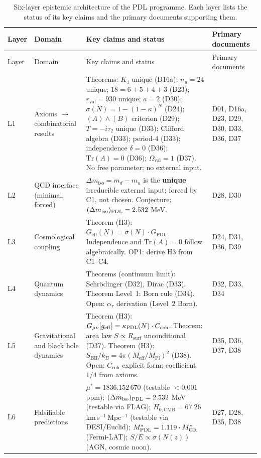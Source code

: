 \documentclass[11pt,a4paper]{article}
\theoremstyle{plain}
\theoremstyle{definition}
\theoremstyle{remark}
\newcommand{\PDL}{\textnormal{PDL}}
\newcommand{\Kfour}{K_4}
\newcommand{\Geff}{G_{\mathrm{eff}}}
\newcommand{\GPDL}{G_{\mathrm{PDL}}}
\newcommand{\rval}{r_{\mathrm{val}}}
\newcommand{\Rsurf}{R_{\mathrm{surf}}}
\newcommand{\sigmaN}{\sigma(N)}
\newcommand{\mustar}{\mu^*}
\newcommand{\SBH}{S_{\mathrm{BH}}}
\newcommand{\Meff}{M_{\mathrm{eff}}}
\newcommand{\MPl}{M_{\mathrm{Pl}}}
\begin{document}
\begin{longtable}{@{}L{0.6cm}L{3.0cm}L{5.5cm}L{4.0cm}@{}}
\caption{Six-layer epistemic architecture of the PDL programme. Each layer lists the status of its key claims and the primary documents supporting them.}
\label{tab:epistemic}\\
\toprule
Layer & Domain & Key claims and status & Primary documents \\
\midrule
\endfirsthead
\toprule
Layer & Domain & Key claims and status & Primary documents \\
\midrule
\endhead
\bottomrule
\endfoot

L1 & Axioms $\to$ combinatorial results &
\textcolor{proofblue}{Theorems}: $\Kfour$ unique (D16a); $n_u=24$ unique; $18=6+5+4+3$ (D23); $\rval=930$ unique; $a=2$ (D30); $\sigma(N)=1-(1-\kappa)^N$ (D24); $(A)\wedge(B)$ criterion (D29); $T=-i\tau_2$ unique (D33); Clifford algebra (D33); period-4 (D33); independence $\delta=0$ (D36); $\mathrm{Tr}(A)=0$ (D36); $\Omega_{\mathrm{val}}=1$ (D37).
No free parameter; no external input. &
D01, D16a, D23, D29, D30, D33, D36, D37 \\[0.4em]

L2 & QCD interface (minimal, forced) &
$\Delta m_{\mathrm{iso}} = m_d - m_u$ is the \textbf{unique} irreducible external input; forced by C1, not chosen.
\textcolor{conjecturegreen}{Conjecture}: $(\Delta m_{\mathrm{iso}})_{\PDL}=2.532$ MeV. &
D28, D30 \\[0.4em]

L3 & Cosmological coupling &
\textcolor{proofblue}{Theorem (H3)}: $\Geff(N)=\sigmaN\cdot\GPDL$.
Independence and $\mathrm{Tr}(A)=0$ follow algebraically.
\textcolor{openproblemred}{OP1}: derive H3 from C1--C4. &
D24, D31, D36, D39 \\[0.4em]

L4 & Quantum dynamics &
\textcolor{proofblue}{Theorems} (continuum limit): Schr\"odinger (D32), Dirac (D33).
\textcolor{proofblue}{Theorem Level~1}: Born rule (D34).
\textcolor{openproblemred}{Open}: $\alpha_\tau$ derivation (Level~2 Born). &
D32, D33, D34 \\[0.4em]

L5 & Gravitational and black hole dynamics &
\textcolor{proofblue}{Theorem (H3)}: $G_{\mu\nu}[g_{\mathrm{eff}}]=\kappa_{\PDL}(N)\cdot C_{\mathrm{coh}}$.
\textcolor{proofblue}{Theorem}: area law $S\propto\Rsurf$ unconditional (D37).
\textcolor{proofblue}{Theorem (H3)}: $\SBH/k_B=4\pi(\Meff/\MPl)^2$ (D38).
\textcolor{openproblemred}{Open}: $C_{\mathrm{coh}}$ explicit form; coefficient $1/4$ from axioms. &
D35, D36, D37, D38 \\[0.4em]

L6 & Falsifiable predictions &
$\mustar=1836.152\,670$ (testable $<0.001$ ppm);
$(\Delta m_{\mathrm{iso}})_{\PDL}=2.532$ MeV (testable via FLAG);
$H_{0,\mathrm{CMB}}=67.26$ km\,s$^{-1}$\,Mpc$^{-1}$ (testable via DESI/Euclid);
$M^*_{\PDL}=1.119\cdot M^*_{\mathrm{GR}}$ (Fermi-LAT);
$S/E\propto\sigma(N(z))$ (AGN, cosmic noon). &
D27, D28, D35, D38 \\[0.4em]

\end{longtable}
\end{document}
